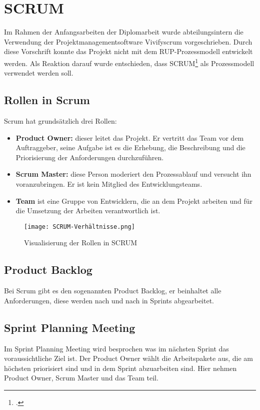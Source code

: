 \section{SCRUM}
Im Rahmen der Anfangsarbeiten der Diplomarbeit wurde abteilungsintern die Verwendung der Projektmanagementsoftware Vivifyscrum vorgeschrieben. Durch diese Vorschrift konnte das Projekt nicht mit dem RUP-Prozessmodell entwickelt werden. 
Als Reaktion darauf wurde entschieden, dass SCRUM\footcite{Lehrunterlagen-SCRUM} als Prozessmodell verwendet werden soll.
\subsection{Rollen in Scrum}
Scrum hat grundsätzlich drei Rollen:
\begin{itemize} 
	\item \textbf{Product Owner:} dieser leitet das Projekt. Er vertritt das Team vor dem Auftraggeber, seine Aufgabe ist es die Erhebung, die Beschreibung und die Priorisierung der Anforderungen durchzuführen.
	\item \textbf{Scrum Master:} diese Person moderiert den Prozessablauf und versucht ihn voranzubringen. Er ist kein Mitglied des Entwicklungsteams.
	\item \textbf{Team} ist eine Gruppe von Entwicklern, die an dem Projekt arbeiten und für die Umsetzung der Arbeiten verantwortlich ist.
\end{itemize}
\begin{center}
\begin{figure}[H]
	\centering
	\texttt{[image: SCRUM-Verhältnisse.png]}
	\caption{Visualisierung der Rollen in SCRUM}
\end{figure}
\end{center}
\subsection{Product Backlog}
Bei Scrum gibt es den sogenannten Product Backlog, er beinhaltet alle Anforderungen, diese werden nach und nach in Sprints abgearbeitet.
\subsection{Sprint Planning Meeting}
Im Sprint Planning Meeting wird besprochen was im nächsten Sprint das voraussichtliche Ziel ist. Der Product Owner wählt die Arbeitspakete aus, die am höchsten priorisiert sind und in dem Sprint abzuarbeiten sind. Hier nehmen Product Owner, Scrum Master und das Team teil. 
